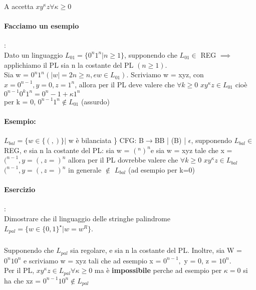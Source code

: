 \documentclass[12pt, a4paper, openany, oneside]{book}
\begin{document}
\begin{center}
\end{center}
A accetta $xy^{\kappa}z \forall \kappa \geq 0$
\paragraph{Facciamo un esempio}:\\
Dato un linguaggio $L_{01} = \{0^n 1^n | n\geq 1\}$, supponendo che $L_{01} \in$ REG
$\implies$ applichiamo il PL sia n la costante del PL $(n\geq 1)$. \\
Sia w = $0^{n}1^{n} (|w| = 2n \geq n, e w \in L_{01})$. Scriviamo w = xyz, con 
$x = 0^{n-1}, y=0, z=1^{n}$, allora per il PL deve valere che $\forall k \geq 0$
$xy^{\kappa}z \in L_{01}$ cioè $0^{n-1}0^{k}1^{n} = 0^{n}
-1+\kappa 1^{n}$\\
per k = 0, $0^{n-1}1^{n}\notin L_{01}$ (assurdo)
\paragraph{Esempio: }
$L_{bal} = \{w \in \{(,)\} |$ w è bilanciata \}
CFG: B$\to$BB | (B) | $\epsilon$, supponendo $L_{bal} \in$ REG, e sia n la costante
del PL: sia w = $(^{n})^{n} $e sia w = xyz tale che x = $(^{n-1} , y= (, z = )^{n}$
allora per il PL dovrebbe valere che $\forall k \geq 0$ $xy^{\kappa}z \in L_{bal}$
$(^{n-1} , y= (, z = )^{n}$ in generale $\notin$ $L_{bal}$ (ad esempio per k=0)
\paragraph{Esercizio}:\\
Dimostrare che il linguaggio delle stringhe palindrome 
$L_{pal} = \{w \in \{0,1\}^{\star} | w = w^{R}\}$.
\subparagraph{}Supponendo che $L_{pal}$ sia regolare, e sia n la costante del PL.
Inoltre, sia W = $0^{n}10^{n}$ e scriviamo w = xyz tali che ad esempio x = $0^{n-1},$
y = 0, z = $10^{n}$. \\
Per il PL, $xy^{\kappa}z \in L_{pal} \forall \kappa \geq 0$ ma è \textbf{impossibile}
perche ad esempio per $\kappa = 0$ si ha che xz = $0^{n-1}10^{n} \notin L_{pal}$
\end{document}
